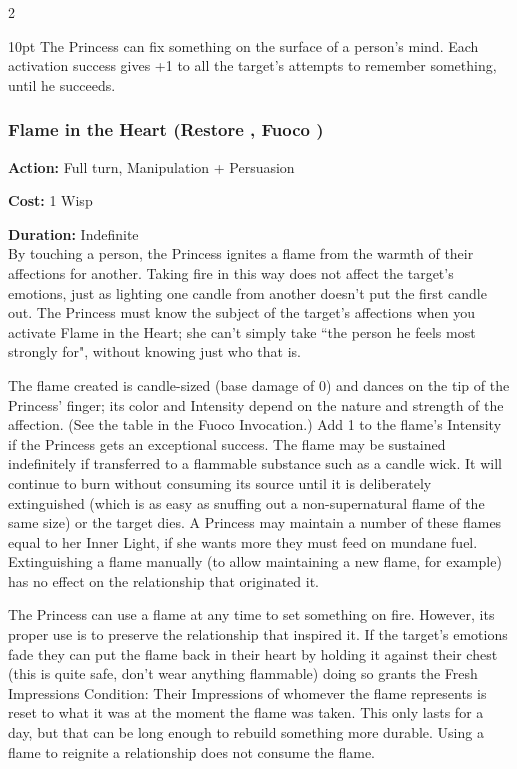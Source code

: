 \begin{multicols}{2}
\begin{myindentpar}{10pt}
The Princess can fix something on the surface of a person's mind. Each activation success gives +1 to all the target's attempts to remember something, until he succeeds.\end{myindentpar}

\subsubsection*{Flame in the Heart (Restore \textbullet\textbullet, Fuoco \textbullet)}

\noindent \textbf{Action:} Full turn, Manipulation + Persuasion

\noindent \textbf{Cost:} 1 Wisp

\noindent \textbf{Duration:} Indefinite \\

\noindent By touching a person, the Princess ignites a flame from the warmth of their affections for another. Taking fire in this way does not affect the target's emotions, just as lighting one candle from another doesn't put the first candle out. The Princess must know the subject of the target's affections when you activate Flame in the Heart; she can't simply take \textquotedblleft the person he feels most strongly for", without knowing just who that is.

The flame created is candle-sized (base damage of 0) and dances on the tip of the Princess' finger; its color and Intensity depend on the nature and strength of the affection. (See the table in the Fuoco Invocation.) Add 1 to the flame's Intensity if the Princess gets an exceptional success. The flame may be sustained indefinitely if transferred to a flammable substance such as a candle wick. It will continue to burn without consuming its source until it is deliberately extinguished (which is as easy as snuffing out a non-supernatural flame of the same size) or the target dies. A Princess may maintain a number of these flames equal to her Inner Light, if she wants more they must feed on mundane fuel. Extinguishing a flame manually (to allow maintaining a new flame, for example) has no effect on the relationship that originated it.

The Princess can use a flame at any time to set something on fire. However, its proper use is to preserve the relationship that inspired it. If the target's emotions fade they can put the flame back in their heart by holding it against their chest (this is quite safe, don't wear anything flammable) doing so grants the Fresh Impressions Condition: Their Impressions of whomever the flame represents is reset to what it was at the moment the flame was taken. This only lasts for a day, but that can be long enough to rebuild something more durable. Using a flame to reignite a relationship does not consume the flame.


\end{multicols}
